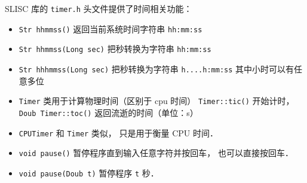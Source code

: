 

SLISC 库的 \verb|timer.h| 头文件提供了时间相关功能：
\begin{itemize}
\item \verb|Str hhmmss()| 返回当前系统时间字符串 \verb|hh:mm:ss|
\item \verb|Str hhmmss(Long sec)| 把秒转换为字符串 \verb|hh:mm:ss|
\item \verb|Str hhhmmss(Long sec)| 把秒转换为字符串 \verb|h....h:mm:ss| 其中小时可以有任意多位
\item \verb|Timer| 类用于计算物理时间（区别于 cpu 时间） \verb|Timer::tic()| 开始计时， \verb|Doub Timer::toc()| 返回流逝的时间（单位：s）
\item \verb|CPUTimer| 和 \verb|Timer| 类似， 只是用于衡量 CPU 时间．
\item \verb|void pause()| 暂停程序直到输入任意字符并按回车， 也可以直接按回车．
\item \verb|void pause(Doub t)| 暂停程序 \verb|t| 秒．
\end{itemize}
